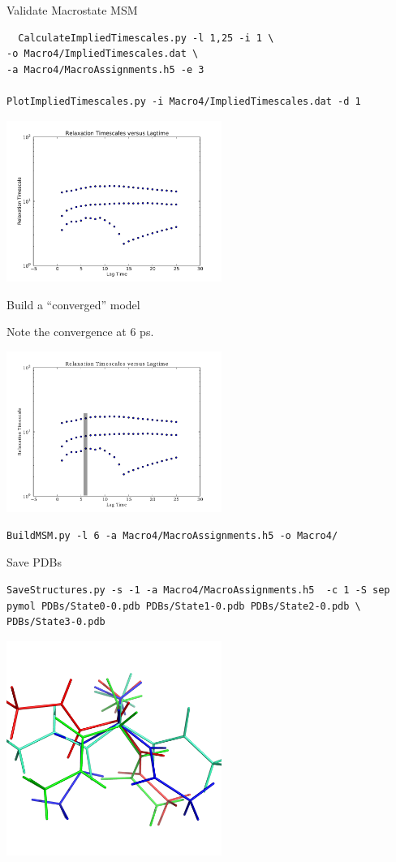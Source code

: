 \documentclass[10pt]{beamer}
\begin{document}
\begin{frame}[fragile]{Validate Macrostate MSM}
 \begin{verbatim}
  CalculateImpliedTimescales.py -l 1,25 -i 1 \
-o Macro4/ImpliedTimescales.dat \
-a Macro4/MacroAssignments.h5 -e 3

PlotImpliedTimescales.py -i Macro4/ImpliedTimescales.dat -d 1

 \end{verbatim}

 \includegraphics[width=7.0cm]{Figures/macro_implied.pdf}
 
\end{frame}

\begin{frame}[fragile]{Build a ``converged'' model}

Note the convergence at 6 ps.

\includegraphics[width=7.0cm]{Figures/macro_implied-cut.pdf}

 \begin{verbatim}
BuildMSM.py -l 6 -a Macro4/MacroAssignments.h5 -o Macro4/   
 \end{verbatim}


\end{frame}


\begin{frame}[fragile]{Save PDBs}
 
\begin{verbatim}
SaveStructures.py -s -1 -a Macro4/MacroAssignments.h5  -c 1 -S sep
pymol PDBs/State0-0.pdb PDBs/State1-0.pdb PDBs/State2-0.pdb \
PDBs/State3-0.pdb
\end{verbatim}

\includegraphics[width=7.0cm]{Figures/ala.png}
 
\end{frame}
\end{document}
